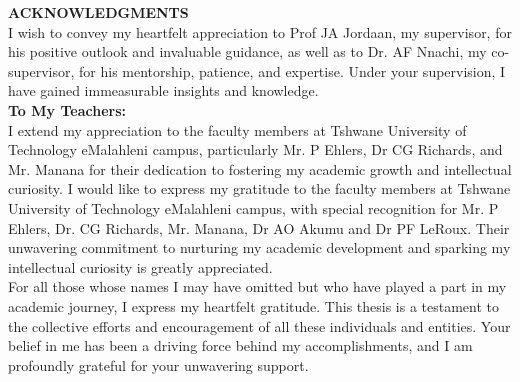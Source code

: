 \textbf{ACKNOWLEDGMENTS}  %
\vspace{0.2cm}
\\\relax
I wish to convey my heartfelt appreciation to Prof JA Jordaan, my supervisor, for his positive outlook and invaluable guidance, as well as to Dr. AF Nnachi, my co-supervisor, for his mentorship, patience, and expertise. Under your supervision, I have gained immeasurable insights and knowledge.
\vspace{0.2cm}
\textbf{\\To My Teachers:} 
\vspace{0.2cm}
\\\relax
I extend my appreciation to the faculty members at Tshwane University of Technology eMalahleni campus, particularly Mr. P Ehlers, Dr CG Richards, and Mr. Manana for their dedication to fostering my academic growth and intellectual curiosity.
I would like to express my gratitude to the faculty members at Tshwane University of Technology eMalahleni campus, with special recognition for Mr. P Ehlers, Dr. CG Richards, Mr. Manana, Dr AO Akumu and Dr PF LeRoux. Their unwavering commitment to nurturing my academic development and sparking my intellectual curiosity is greatly appreciated.
\vspace{0.2cm}
\\\relax
For all those whose names I may have omitted but who have played a part in my academic journey, I express my heartfelt gratitude.
This thesis is a testament to the collective efforts and encouragement of all these individuals and entities. Your belief in me has been a driving force behind my accomplishments, and I am profoundly grateful for your unwavering support.



\vspace{1.8cm}
